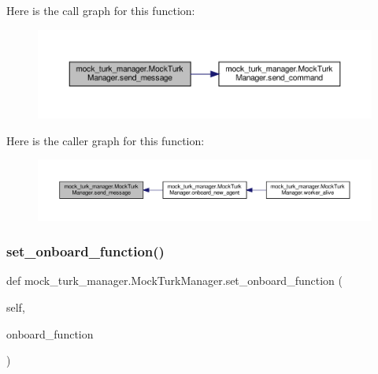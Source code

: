Here is the call graph for this function\+:
\nopagebreak
\begin{figure}[H]
\begin{center}
\leavevmode
\includegraphics[width=350pt]{classmock__turk__manager_1_1MockTurkManager_a06ee464221ed467a72172cb19352e6eb_cgraph}
\end{center}
\end{figure}
Here is the caller graph for this function\+:
\nopagebreak
\begin{figure}[H]
\begin{center}
\leavevmode
\includegraphics[width=350pt]{classmock__turk__manager_1_1MockTurkManager_a06ee464221ed467a72172cb19352e6eb_icgraph}
\end{center}
\end{figure}
\mbox{\label{classmock__turk__manager_1_1MockTurkManager_a1becae520bdd1de25632adeadf0f67c5}} 
\subsubsection{\texorpdfstring{set\+\_\+onboard\+\_\+function()}{set\_onboard\_function()}}
{\footnotesize\ttfamily def mock\+\_\+turk\+\_\+manager.\+Mock\+Turk\+Manager.\+set\+\_\+onboard\+\_\+function (\begin{DoxyParamCaption}\item[{}]{self,  }\item[{}]{onboard\+\_\+function }\end{DoxyParamCaption})}



